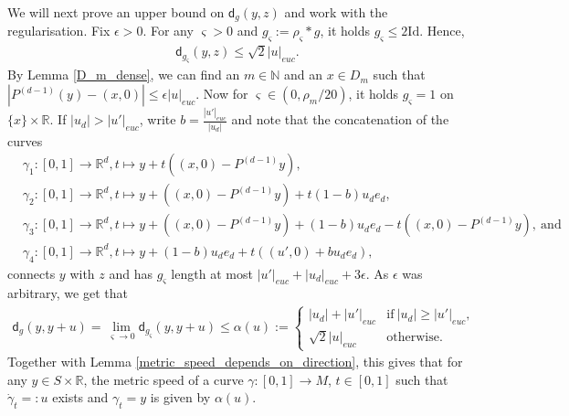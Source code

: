 \documentclass[a4paper,10pt]{article}
\numberwithin{equation}{section}
\newcommand{\R}{\mathbb{R}}
\newcommand{\N}{\mathbb{N}}
\newcommand{\sfd}{\mathsf d}
\begin{document}
We will next prove an upper bound on $\sfd_g(y,z)$ and work with the regularisation. Fix $\epsilon >0$. For any $\varsigma >0$ and $g_\varsigma := \rho_{\varsigma} * g$, it holds $g_\varsigma \leq 2 \mathrm{Id}$. Hence,
\begin{align*}
    \sfd_{g_\varsigma}(y,z) \leq \sqrt{2}|u|_{euc}.
\end{align*}
By Lemma \ref{D_m_dense}, we can find an $m \in \N$ and an $x \in D_m$ such that $|P^{(d-1)}(y)-(x, 0)| \leq \epsilon|u|_{euc}$. Now for $\varsigma \in (0, \rho_m/20)$, it holds $g_\varsigma =1$ on $\{x\} \times \R$. If $|u_d|> |u'|_{euc}$, write $b= \frac{|u'|_{euc}}{|u_d|}$ and note that the concatenation of the curves
\begin{align*}
    &\gamma_1:[0,1] \to \R^d, t \mapsto y+t((x,0)-P^{(d-1)}y), \\
    &\gamma_2:[0,1] \to \R^d, t \mapsto y+((x,0)-P^{(d-1)}y) + t(1-b)u_de_d, \\
    &\gamma_3:[0,1] \to \R^d, t \mapsto  y+((x,0)-P^{(d-1)}y) + (1-b)u_de_d-t((x,0)-P^{(d-1)}y),\ \mathrm{and} \\
    &\gamma_4:[0,1] \to \R^d, t \mapsto  y + (1-b)u_de_d + t((u',0)+ bu_de_d),
\end{align*}
connects $y$ with $z$ and has $g_\varsigma$ length at most $|u'|_{euc} + |u_d|_{euc} + 3 \epsilon$. As $\epsilon$ was arbitrary, we get that 
\begin{align}\label{upper_bpund_metric_ex2}
    \sfd_g(y, y+u)= \lim_{\varsigma \to 0} \sfd_{g_\varsigma}(y, y+u) \leq \alpha(u):=  \left\{ \begin{array}{ll}
           |u_d| + |u'|_{euc} & \mathrm{if}\ |u_d| \geq |u'|_{euc}, \\
           \sqrt{2}|u|_{euc}\  & \mathrm{otherwise}.
        \end{array}\right.
\end{align}
Together with Lemma \ref{metric_speed_depends_on_direction}, this gives that for any $y \in S \times \R$, the metric speed of a curve $\gamma:[0,1] \to M$, $t\in [0,1]$ such that $\dot{\gamma}_t=: u$ exists and $\gamma_t = y$ is given by $\alpha(u)$. 
\end{document}
